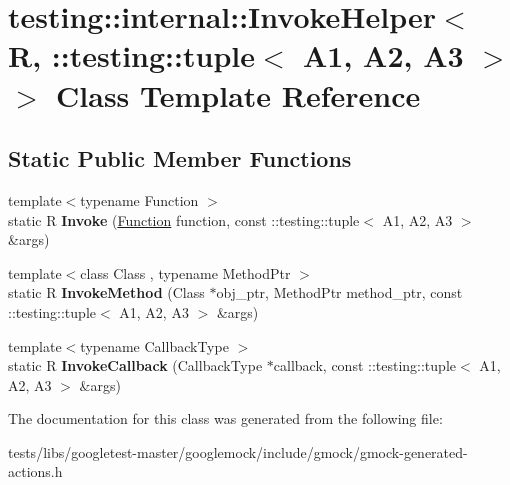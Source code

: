 \hypertarget{classtesting_1_1internal_1_1InvokeHelper_3_01R_00_01_1_1testing_1_1tuple_3_01A1_00_01A2_00_01A3_01_4_01_4}{}\section{testing\+:\+:internal\+:\+:Invoke\+Helper$<$ R, \+:\+:testing\+:\+:tuple$<$ A1, A2, A3 $>$ $>$ Class Template Reference}
\label{classtesting_1_1internal_1_1InvokeHelper_3_01R_00_01_1_1testing_1_1tuple_3_01A1_00_01A2_00_01A3_01_4_01_4}
\subsection*{Static Public Member Functions}
\begin{DoxyCompactItemize}
\item 
\mbox{\label{classtesting_1_1internal_1_1InvokeHelper_3_01R_00_01_1_1testing_1_1tuple_3_01A1_00_01A2_00_01A3_01_4_01_4_a8461645c6bcfb49e465fcfbeb38cd685}} 
{\footnotesize template$<$typename Function $>$ }\\static R {\bfseries Invoke} (\hyperlink{structtesting_1_1internal_1_1Function}{Function} function, const \+::testing\+::tuple$<$ A1, A2, A3 $>$ \&args)
\item 
\mbox{\label{classtesting_1_1internal_1_1InvokeHelper_3_01R_00_01_1_1testing_1_1tuple_3_01A1_00_01A2_00_01A3_01_4_01_4_a6b2473ea7c58ff4c2ed46c7117fa7baa}} 
{\footnotesize template$<$class Class , typename Method\+Ptr $>$ }\\static R {\bfseries Invoke\+Method} (Class $\ast$obj\+\_\+ptr, Method\+Ptr method\+\_\+ptr, const \+::testing\+::tuple$<$ A1, A2, A3 $>$ \&args)
\item 
\mbox{\label{classtesting_1_1internal_1_1InvokeHelper_3_01R_00_01_1_1testing_1_1tuple_3_01A1_00_01A2_00_01A3_01_4_01_4_a4b2b3002d1c4a9b0891568bdd4da1a87}} 
{\footnotesize template$<$typename Callback\+Type $>$ }\\static R {\bfseries Invoke\+Callback} (Callback\+Type $\ast$callback, const \+::testing\+::tuple$<$ A1, A2, A3 $>$ \&args)
\end{DoxyCompactItemize}


The documentation for this class was generated from the following file\+:\begin{DoxyCompactItemize}
\item 
tests/libs/googletest-\/master/googlemock/include/gmock/gmock-\/generated-\/actions.\+h\end{DoxyCompactItemize}
